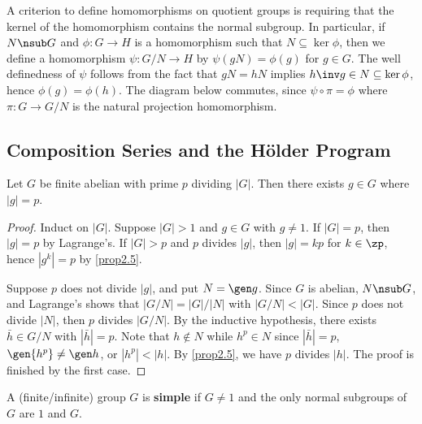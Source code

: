 \note A criterion to define homomorphisms on quotient groups is requiring that the kernel of the homomorphism contains the normal subgroup. In particular, if $N \nsub G$ and $\phi : G \to H$ is a homomorphism such that $N \subseteq \ker\phi$, then we define a homomorphism $\psi : G/N \to H$ by $\psi(gN) = \phi(g)$ for $g \in G$. The well definedness of $\psi$ follows from the fact that $gN = hN$ implies $h\inv g \in N \subseteq \ker\phi$, hence $\phi(g) = \phi(h)$. The diagram below commutes, since $\psi \circ \pi = \phi$ where $\pi : G \to G/N$ is the natural projection homomorphism.
\begin{center}
\end{center}

\newpage

\subsection{Composition Series and the H\"older Program} \label{sec3.4}

 \label{prop3.21}
Let $G$ be finite abelian with prime $p$ dividing $|G|$. Then there exists $g \in G$ where $|g| = p$.

\begin{proof}
    Induct on $|G|$. Suppose $|G| > 1$ and $g \in G$ with $g \neq 1$. If $|G| = p$, then $|g| = p$ by Lagrange's. If $|G| > p$ and $p$ divides $|g|$, then $|g| = kp$ for $k \in \zp$, hence $|g^k| = p$ by \autoref{prop2.5}.

    Suppose $p$ does not divide $|g|$, and put $N = \gen g$. Since $G$ is abelian, $N \nsub G$, and Lagrange's shows that $|G/N| = |G|/|N|$ with $|G/N| < |G|$. Since $p$ does not divide $|N|$, then $p$ divides $|G/N|$. By the inductive hypothesis, there exists $\bar h \in G/N$ with $|\bar h| = p$. Note that $h \not\in N$ while $h^p \in N$ since $|\bar h| = p$, $\gen{h^p} \neq \gen h$, or $|h^p| < |h|$. By \autoref{prop2.5}, we have $p$ divides $|h|$. The proof is finished by the first case.
\end{proof}

 A (finite/infinite) group $G$ is \textbf{simple} if $G \neq 1$ and the only normal subgroups of $G$ are $1$ and $G$.


